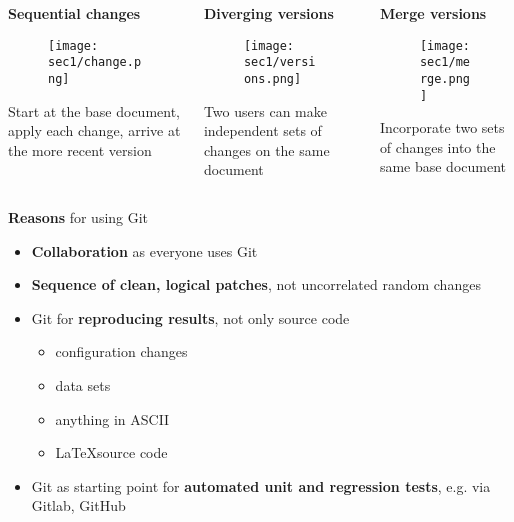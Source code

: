 \begin{frame}[fragile]
\emptyframetitle
  \begin{columns}
    \begin{column}{0.33\textwidth}
{\bf Sequential changes}
      \begin{figure}[h]
      \texttt{[image: sec1/change.png]}
      \end{figure}
      Start at the base document, apply each change, arrive at the more recent version
    \end{column}
    \begin{column}{0.33\textwidth}
{\bf Diverging versions}
      \begin{figure}[h]
      \texttt{[image: sec1/versions.png]}
      \end{figure}
      Two users can make independent sets of changes on the same document
    \end{column}
    \begin{column}{0.33\textwidth}
{\bf Merge versions}
      \begin{figure}[h]
      \texttt{[image: sec1/merge.png]}
      \end{figure}
      Incorporate two sets of changes into the same base document
    \end{column}

  \end{columns}

\end{frame}

\begin{frame}[fragile]
\emptyframetitle

\textbf{Reasons} for using Git\\[10pt]

\begin{itemize}
\setlength\itemsep{10pt}
  \item \textbf{Collaboration} as everyone uses Git
  \item \textbf{Sequence of clean, logical patches}, not uncorrelated random changes
  \item Git for \textbf{reproducing results}, not only source code
  \begin{itemize}
    \normalsize
    \item configuration changes
    \item data sets
    \item anything in ASCII
    \item \LaTeX source code
  \end{itemize}
  \item Git as starting point for \textbf{automated unit and regression tests}, e.g. via Gitlab, GitHub
\end{itemize}
\end{frame}

